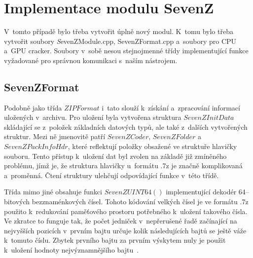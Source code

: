 %

\section{Implementace modulu SevenZ}
V~tomto případě bylo třeba vytvořit úplně nový modul. K~tomu bylo třeba vytvořit soubory {\textit
SevenZModule.cpp, SevenZFormat.cpp} a~soubory pro CPU a~GPU cracker. Soubory v~sobě nesou
stejnojmenné třídy implementující funkce vyžadované pro správnou komunikaci s~naším nástrojem.

\subsection{SevenZFormat}
Podobně jako třída $ZIPFormat$ i~tato slouží k~získání a~zpracování informací uložených
v~archivu. Pro uložení byla vytvořena struktura $SevenZInitData$ skládající se z~položek základních
datových typů, ale také z~dalších vytvořených struktur. Mezi ně jmenovitě patří $SevenZCoder$,
$SevenZFolder$ a~$SevenZPackInfoHdr$, které reflektují položky obsažené ve struktuře hlavičky
souboru. Tento přístup k~uložení dat byl zvolen na základě již zmíněného problému, jímž je, že
struktura hlavičky u~formátu .7z je značně komplikovaná a~proměnná. Čtení struktury ulehčují
odpovídající funkce v~této třídě.

 Třída mimo jiné obsahuje funkci $SevenZUINT64()$ implementující dekodér 64--bitových
bezznaménkových čísel. Tohoto kódování velkých čísel je ve formátu .7z použito k~redukování
paměťového prostoru potřebného k~uložení takového čísla. Ve zkratce to funguje tak, že počet
jedniček v~nepřerušené řadě začínající na nejvyšších pozicích v~prvním bajtu určuje kolik
následujících bajtů se ještě váže k~tomuto číslu. Zbytek prvního bajtu za prvním výskytem nuly je
použit k~uložení hodnoty nejvýznamnějšího bajtu~\cite{Pavlov:2010}. 

